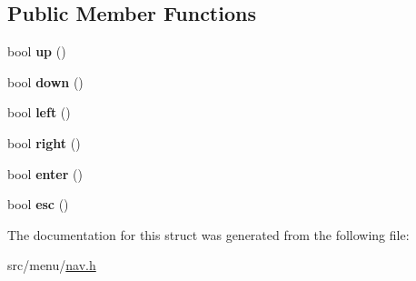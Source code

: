 \subsection*{Public Member Functions}
\begin{DoxyCompactItemize}
\item 
\mbox{\label{structNavCap_aa0b264a1dcab39a8a3b8d2f9bc814c73}} 
bool {\bfseries up} ()
\item 
\mbox{\label{structNavCap_a94f5b1c9871167469e28685c2b6a435f}} 
bool {\bfseries down} ()
\item 
\mbox{\label{structNavCap_a630b475310459b88a75dee9fb07add3c}} 
bool {\bfseries left} ()
\item 
\mbox{\label{structNavCap_a6e53f7f90c1e3c596383513fa61a0811}} 
bool {\bfseries right} ()
\item 
\mbox{\label{structNavCap_aa02a28eed35238a9e16d520276df4120}} 
bool {\bfseries enter} ()
\item 
\mbox{\label{structNavCap_a80a06c48b81a8b181af2eeac311e0304}} 
bool {\bfseries esc} ()
\end{DoxyCompactItemize}


The documentation for this struct was generated from the following file\+:\begin{DoxyCompactItemize}
\item 
src/menu/\hyperlink{nav_8h}{nav.\+h}\end{DoxyCompactItemize}
